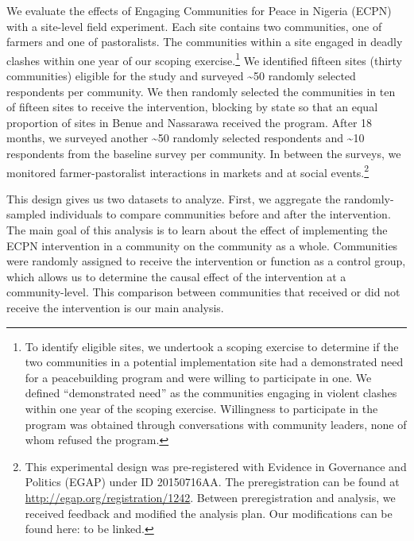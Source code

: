 \documentclass[11pt]{article}
\begin{document}
We evaluate the effects of Engaging Communities for Peace in Nigeria
(ECPN) with a site-level field experiment. Each site contains two
communities, one of farmers and one of pastoralists. The communities
within a site engaged in deadly clashes within one year of our scoping
exercise.\footnote{To identify eligible sites, we undertook a scoping
  exercise to determine if the two communities in a potential
  implementation site had a demonstrated need for a peacebuilding
  program and were willing to participate in one. We defined
  ``demonstrated need'' as the communities engaging in violent clashes
  within one year of the scoping exercise. Willingness to participate in
  the program was obtained through conversations with community leaders,
  none of whom refused the program.} We identified fifteen sites (thirty
communities) eligible for the study and surveyed \textasciitilde50
randomly selected respondents per community. We then randomly selected
the communities in ten of fifteen sites to receive the intervention,
blocking by state so that an equal proportion of sites in Benue and
Nassarawa received the program. After 18 months, we surveyed another
\textasciitilde50 randomly selected respondents and \textasciitilde10
respondents from the baseline survey per community. In between the
surveys, we monitored farmer-pastoralist interactions in markets and at
social events.\footnote{This experimental design was pre-registered with
  Evidence in Governance and Politics (EGAP) under ID 20150716AA. The
  preregistration can be found at
  \url{http://egap.org/registration/1242}. Between preregistration and
  analysis, we received feedback and modified the analysis plan. Our
  modifications can be found here: to be linked.}

This design gives us two datasets to analyze. First, we aggregate the
randomly-sampled individuals to compare communities before and after the
intervention. The main goal of this analysis is to learn about the
effect of implementing the ECPN intervention in a community on the
community as a whole. Communities were randomly assigned to receive the
intervention or function as a control group, which allows us to
determine the causal effect of the intervention at a community-level.
This comparison between communities that received or did not receive the
intervention is our main analysis.
\end{document}
